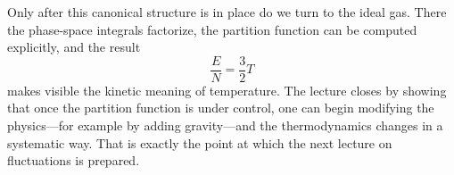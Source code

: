 Only after this canonical structure is in place do we turn to the ideal gas. There the phase-space integrals factorize, the partition function can be computed explicitly, and the result
\begin{equation}
\frac{E}{N}=\frac{3}{2}T
\end{equation}
makes visible the kinetic meaning of temperature. The lecture closes by showing that once the partition function is under control, one can begin modifying the physics---for example by adding gravity---and the thermodynamics changes in a systematic way. That is exactly the point at which the next lecture on fluctuations is prepared.